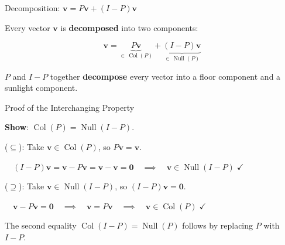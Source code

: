 \documentclass[10pt]{beamer}
\theoremstyle{definition}
\newcommand{\x}[1]{\alert{\textbf{#1}}}
\begin{document}
\begin{frame}{Decomposition: $\mathbf{v} = P\mathbf{v} + (I-P)\mathbf{v}$}

Every vector $\mathbf{v}$ is \x{decomposed} into two components:

\begin{center}
\end{center}

$$\mathbf{v} = \underbrace{P\mathbf{v}}_{\in\, \operatorname{Col}(P)} + \underbrace{(I-P)\mathbf{v}}_{\in\, \operatorname{Null}(P)}$$

$P$ and $I-P$ together \x{decompose} every vector into a floor component and a sunlight component.

\end{frame}

\begin{frame}{Proof of the Interchanging Property}

\x{Show}: $\operatorname{Col}(P) = \operatorname{Null}(I - P)$.

\vspace{0.5em}

($\subseteq$): Take $\mathbf{v} \in \operatorname{Col}(P)$, so $P\mathbf{v} = \mathbf{v}$.

$\quad (I-P)\mathbf{v} = \mathbf{v} - P\mathbf{v} = \mathbf{v} - \mathbf{v} = \mathbf{0} \quad\implies\quad \mathbf{v} \in \operatorname{Null}(I-P) \;\checkmark$

\vspace{0.5em}

($\supseteq$): Take $\mathbf{v} \in \operatorname{Null}(I-P)$, so $(I-P)\mathbf{v} = \mathbf{0}$.

$\quad \mathbf{v} - P\mathbf{v} = \mathbf{0} \quad\implies\quad \mathbf{v} = P\mathbf{v} \quad\implies\quad \mathbf{v} \in \operatorname{Col}(P) \;\checkmark$

\vspace{0.5em}

The second equality $\operatorname{Col}(I-P) = \operatorname{Null}(P)$ follows by replacing $P$ with $I-P$.

\end{frame}
\end{document}
